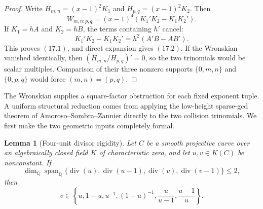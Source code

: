 \documentclass[11pt]{article}
\newtheorem{lemma}[theorem]{Lemma}
\theoremstyle{definition}
\newcommand{\Q}{\mathbb Q}
\begin{document}
\begin{proof}
Write \(H_{m,n}=(x-1)^2K_1\) and
\(H_{p,q}=(x-1)^2K_2\).  Then
\[
 W_{m,n;p,q}=(x-1)^4(K_1'K_2-K_1K_2').
\]
If \(K_1=hA\) and \(K_2=hB\), the terms containing \(h'\) cancel:
\[
 K_1'K_2-K_1K_2'=h^2(A'B-AB').
\]
This proves \((17.1)\), and direct expansion gives \((17.2)\).
If the Wronskian vanished identically, then
\((H_{m,n}/H_{p,q})'=0\), so the two trinomials would be scalar multiples.
Comparison of their three nonzero supports \(\{0,m,n\}\) and
\(\{0,p,q\}\) would force \((m,n)=(p,q)\).
\end{proof}

The Wronskian supplies a square-factor obstruction for each fixed exponent
tuple.  A uniform structural reduction comes from applying the low-height
sparse-gcd theorem of Amoroso--Sombra--Zannier directly to the two collision
trinomials.  We first make the two geometric inputs completely formal.

\begin{lemma}[Four-unit divisor rigidity]\label{lem:fourunit}
Let \(C\) be a smooth projective curve over an algebraically closed field
\(K\) of characteristic zero, and let \(u,v\in K(C)\) be nonconstant.
If
\[
 \dim_{\Q}\operatorname{span}_{\Q}
 \{\operatorname{div}(u),\operatorname{div}(u-1),
   \operatorname{div}(v),\operatorname{div}(v-1)\}\leq2,
\]
then
\[
 v\in
 \left\{u,1-u,u^{-1},(1-u)^{-1},
          \frac{u}{u-1},\frac{u-1}{u}\right\}.
\]
\end{lemma}
\end{document}
